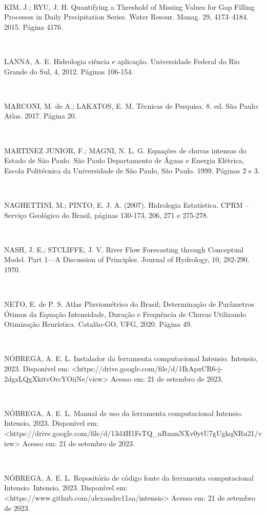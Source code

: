 \begin{flushleft}
\

KIM, J.; RYU, J. H. Quantifying a Threshold of Missing Values for Gap Filling Processes in Daily Precipitation Series. Water Resour. Manag. 29, 4173–4184. 2015. Página 4176.

\

LANNA, A. E. Hidrologia ciência e aplicação. Universidade Federal do Rio Grande do Sul, 4, 2012. Páginas 106-154.

\

MARCONI, M. de A.; LAKATOS, E. M. Técnicas de Pesquisa. 8. ed. São Paulo: Atlas. 2017. Página 20.

\

MARTINEZ JUNIOR, F.; MAGNI, N. L. G. Equações de chuvas intensas do Estado de São Paulo. São Paulo Departamento de Águas e Energia Elétrica, Escola Politécnica da Universidade de São Paulo, São Paulo. 1999. Páginas 2 e 3.

\

NAGHETTINI, M.; PINTO, E. J. A. (2007). Hidrologia Estatística. CPRM – Serviço Geológico do Brasil, páginas 130-173, 206, 271 e 275-278.

\

NASH, J. E.; STCLIFFE, J. V. River Flow Forecasting through Conceptual Model. Part 1—A Discussion of Principles. Journal of Hydrology, 10, 282-290. 1970.

\

NETO, E. de P. S. Atlas Pluviométrico do Brasil; Determinação de Parâmetros Ótimos da Equação Intensidade, Duração e Frequência de Chuvas Utilizando Otimização Heurística. Catalão-GO, UFG, 2020. Página 49.

\newpage

\

NÓBREGA, A. E. L. Instalador da ferramenta computacional Intensio. Intensio, 2023. Disponível em: <https://drive.google.com/file/d/1IkApxCR6-j-2dgzLQgXkitvOrcYOiiNe/view> Acesso em: 21 de setembro de 2023.

\

NÓBREGA, A. E. L. Manual de uso da ferramenta computacional Intensio. Intensio, 2023. Disponível em: <https://drive.google.com/file/d/13d4H1FsTQ\_nRmmNXv0ytU7gUgkqNRu21/view> Acesso em: 21 de setembro de 2023.

\

NÓBREGA, A. E. L. Repositório de código fonte da ferramenta computacional Intensio. Intensio, 2023. Disponível em: <https://www.github.com/alexandre11aa/intensio> Acesso em: 21 de setembro de 2023.


\end{flushleft}
